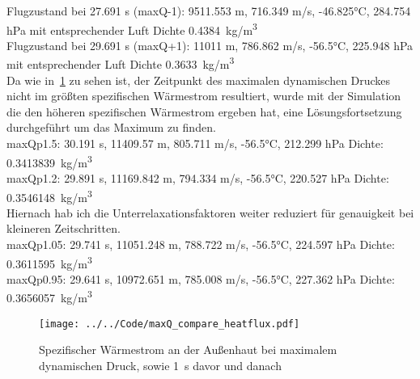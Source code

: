 Flugzustand bei 27.691 s (maxQ-1): 9511.553 m, 716.349 m/s, -46.825°C, 284.754 hPa mit entsprechender Luft Dichte \SI{0.4384}{kg/m^3}\\

Flugzustand bei 29.691 s (maxQ+1): 11011 m, 786.862 m/s, -56.5°C, 225.948 hPa mit entsprechender Luft Dichte \SI{0.3633}{kg/m^3}\\

Da wie in~\ref{fig:spezifischer_waermestrom_maxQ_simulationen} zu sehen ist, der Zeitpunkt des maximalen dynamischen Druckes nicht im größten spezifischen
Wärmestrom resultiert, wurde mit der Simulation die den höheren spezifischen Wärmestrom ergeben hat, eine Lösungsfortsetzung durchgeführt um das Maximum zu finden.\\

maxQp1.5: 30.191 s, 11409.57 m, 805.711 m/s, -56.5°C, 212.299 hPa Dichte: \SI{0.3413839}{kg/m^3}\\
maxQp1.2: 29.891 s, 11169.842 m, 794.334 m/s, -56.5°C, 220.527 hPa Dichte: \SI{0.3546148}{kg/m^3}\\
Hiernach hab ich die Unterrelaxationsfaktoren weiter reduziert für genauigkeit bei kleineren Zeitschritten.\\
maxQp1.05: 29.741 s, 11051.248 m, 788.722 m/s, -56.5°C, 224.597 hPa Dichte: \SI{0.3611595}{kg/m^3}\\
maxQp0.95: 29.641 s, 10972.651 m, 785.008 m/s, -56.5°C, 227.362 hPa Dichte: \SI{0.3656057}{kg/m^3}\\
\begin{figure}[H]
  \centering
  \texttt{[image: ../../Code/maxQ\_compare\_heatflux.pdf]}
  \caption{Spezifischer Wärmestrom an der Außenhaut bei maximalem dynamischen Druck, sowie \SI{1}{s} davor und danach}\label{fig:spezifischer_waermestrom_maxQ_simulationen}
\end{figure}